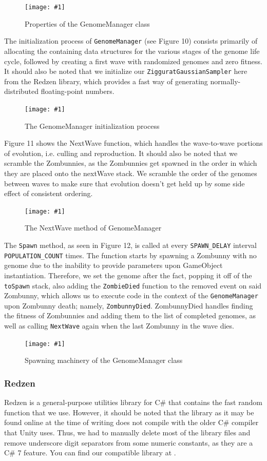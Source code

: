 \documentclass[letterpaper]{article}
\def\imfig#1#2{\begin{figure}[h] \centering \texttt{[image: \#1]} \caption{#2} \end{figure}}
\begin{document}
\imfig{GenomeManagerProperties}{Properties of the GenomeManager class}

The initialization process of \texttt{GenomeManager} (see Figure 10) consists primarily of allocating the containing data structures for the various stages of the genome life cycle, followed by creating a first wave with randomized genomes and zero fitness. It should also be noted that we initialize our \texttt{ZigguratGaussianSampler} here from the Redzen library, which provides a fast way of generating normally-distributed floating-point numbers.

\imfig{GenomeManagerInit}{The GenomeManager initialization process}

Figure 11 shows the NextWave function, which handles the wave-to-wave portions of evolution, i.e. culling and reproduction. It should also be noted that we scramble the Zombunnies, as the Zombunnies get spawned in the order in which they are placed onto the nextWave stack. We scramble the order of the genomes between waves to make sure that evolution doesn't get held up by some side effect of consistent ordering.

\imfig{GenomeManagerNextWave}{The NextWave method of GenomeManager}

The \texttt{Spawn} method, as seen in Figure 12, is called at every
\texttt{SPAWN\_DELAY} interval \texttt{POPULATION\_COUNT} times. The function
starts by spawning a Zombunny with no genome due to the inability to provide
parameters upon GameObject instantiation. Therefore, we set the genome after the
fact, popping it off of the \texttt{toSpawn} stack, also adding the \texttt{ZombieDied} function
to the removed event on said Zombunny, which allows us to execute code in the
context of the \texttt{GenomeManager} upon Zombunny death; namely, \texttt{ZombunnyDied}.
ZombunnyDied handles finding the fitness of Zombunnies and adding them to the
list of completed genomes, as well as calling \texttt{NextWave} again when the last
Zombunny in the wave dies.

\imfig{GenomeManagerSpawn}{Spawning machinery of the GenomeManager class}

\subsubsection{Redzen}

Redzen is a general-purpose utilities library for C\# that contains the fast random function that we use. However, it should be noted that the library as it may be found online at the time of writing does not compile with the older C\# compiler that Unity uses. Thus, we had to manually delete most of the library files and remove underscore digit separators from some numeric constants, as they are a C\# 7 feature. You can find our compatible library at .
\end{document}
